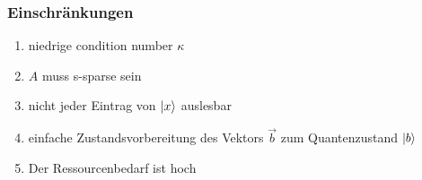 \begin{frame}
    \frametitle{Einschränkungen}
    \begin{enumerate}[<+->]
        \item niedrige condition number $\kappa$ 

        \hfil


        \item $A$ muss s-sparse sein

        \hfil

        \item nicht jeder Eintrag von $\ket{x}$ auslesbar

        \hfil

        \item einfache Zustandsvorbereitung des Vektors $\vec b$ zum Quantenzustand $\ket{b}$

        \hfil

        \item Der Ressourcenbedarf ist hoch
\end{enumerate} \end{frame}
